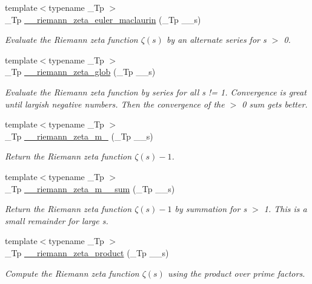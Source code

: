 \begin{DoxyCompactItemize}
{\footnotesize template$<$typename \+\_\+\+Tp $>$ }\\\+\_\+\+Tp \hyperlink{namespacestd_1_1____detail_a84ac805996c4eeb8cbfa181e6e47f0ae}{\+\_\+\+\_\+riemann\+\_\+zeta\+\_\+euler\+\_\+maclaurin} (\+\_\+\+Tp \+\_\+\+\_\+s)
\begin{DoxyCompactList}\small\item\em Evaluate the Riemann zeta function $ \zeta(s) $ by an alternate series for s $>$ 0. \end{DoxyCompactList}\item 
{\footnotesize template$<$typename \+\_\+\+Tp $>$ }\\\+\_\+\+Tp \hyperlink{namespacestd_1_1____detail_ab3542ea44b34da3d4865ed9a014e2951}{\+\_\+\+\_\+riemann\+\_\+zeta\+\_\+glob} (\+\_\+\+Tp \+\_\+\+\_\+s)
\begin{DoxyCompactList}\small\item\em Evaluate the Riemann zeta function by series for all s != 1. Convergence is great until largish negative numbers. Then the convergence of the $>$ 0 sum gets better. \end{DoxyCompactList}\item 
{\footnotesize template$<$typename \+\_\+\+Tp $>$ }\\\+\_\+\+Tp \hyperlink{namespacestd_1_1____detail_a174bfa28eeb176b90ff251b5affbecb2}{\+\_\+\+\_\+riemann\+\_\+zeta\+\_\+m\+\_} (\+\_\+\+Tp \+\_\+\+\_\+s)
\begin{DoxyCompactList}\small\item\em Return the Riemann zeta function $ \zeta(s) - 1 $. \end{DoxyCompactList}\item 
{\footnotesize template$<$typename \+\_\+\+Tp $>$ }\\\+\_\+\+Tp \hyperlink{namespacestd_1_1____detail_a3985751e758b45d726ea8dec0450ca1e}{\+\_\+\+\_\+riemann\+\_\+zeta\+\_\+m\+\_\+\_\+sum} (\+\_\+\+Tp \+\_\+\+\_\+s)
\begin{DoxyCompactList}\small\item\em Return the Riemann zeta function $ \zeta(s) - 1 $ by summation for s $>$ 1. This is a small remainder for large s. \end{DoxyCompactList}\item 
{\footnotesize template$<$typename \+\_\+\+Tp $>$ }\\\+\_\+\+Tp \hyperlink{namespacestd_1_1____detail_a917935f42a21af90b78a19ea81349129}{\+\_\+\+\_\+riemann\+\_\+zeta\+\_\+product} (\+\_\+\+Tp \+\_\+\+\_\+s)
\begin{DoxyCompactList}\small\item\em Compute the Riemann zeta function $ \zeta(s) $ using the product over prime factors. \end{DoxyCompactList}\item 

\end{DoxyCompactItemize}
